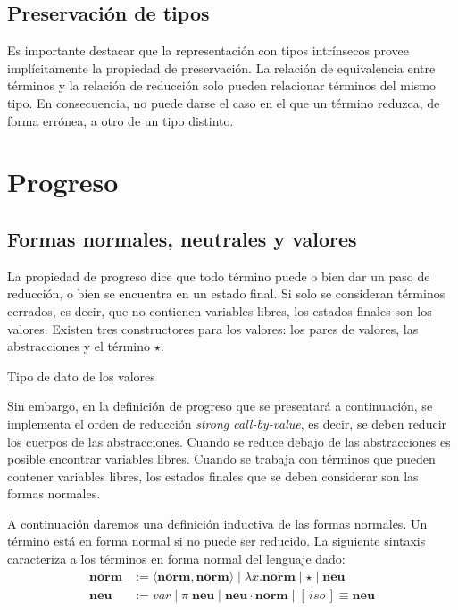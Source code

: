 \subsection{Preservación de tipos}

Es importante destacar que la representación con tipos intrínsecos provee implícitamente la propiedad de preservación.
La relación de equivalencia entre términos \type{$\_\rightleftarrows\_$} y la relación de reducción \type{$\_\hookrightarrow\_$} solo pueden relacionar términos del mismo tipo. 
En consecuencia, no puede darse el caso en el que un término reduzca, de forma errónea, a otro de un tipo distinto.


\section{Progreso}

\subsection{Formas normales, neutrales y valores}

La propiedad de progreso dice que todo término puede o bien dar un paso de reducción, o bien se encuentra en un estado final.
Si solo se consideran términos cerrados, es decir, que no contienen variables libres, los estados finales son los valores.
Existen tres constructores para los valores: los pares de valores, las abstracciones y el término $\star$.

\begin{codigo}
	Tipo de dato de los valores
\end{codigo}

Sin embargo, en la definición de progreso que se presentará a continuación, se implementa el orden de reducción \textit{strong call-by-value}, es decir, se deben reducir los cuerpos de las abstracciones.
Cuando se reduce debajo de las abstracciones es posible encontrar variables libres.
Cuando se trabaja con términos que pueden contener variables libres, los estados finales que se deben considerar son las formas normales.

A continuación daremos una definición inductiva de las formas normales. Un término está en forma normal si no puede ser reducido. La siguiente sintaxis caracteriza a los términos en forma normal del lenguaje dado: 
\begin{align*}
	\textbf{norm} &:= \langle \textbf{norm}, \textbf{norm} \rangle \mid \lambda x. \textbf{norm} \mid \star \mid \textbf{neu} \\
	\textbf{neu} &:= var \mid \pi\; \textbf{neu} \mid \textbf{neu} \cdot \textbf{norm} \mid [\, iso \,]\!\!\equiv \textbf{neu}
\end{align*}


